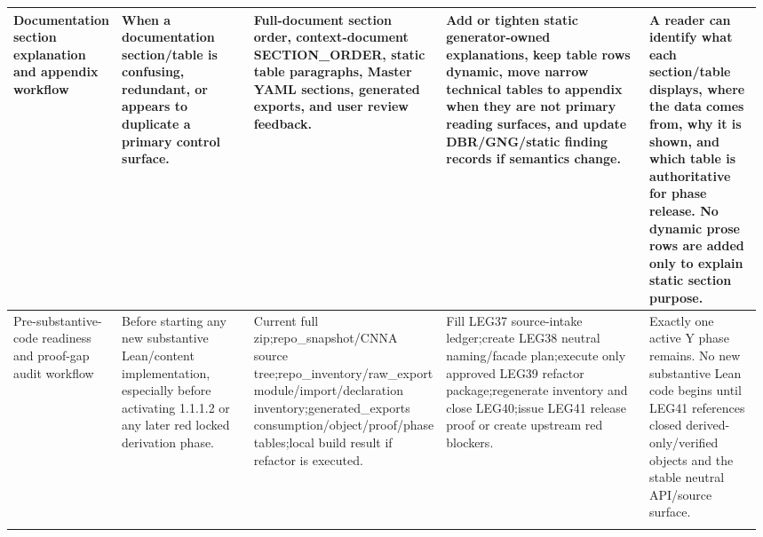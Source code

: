 \begin{longtable}{L{0.14\linewidth} L{0.19\linewidth} L{0.18\linewidth} L{0.31\linewidth} L{0.16\linewidth}}
\hline
\addlinespace[0.24em]
Documentation section explanation and appendix workflow & When a documentation section/\allowbreak{}table is confusing, redundant, or appears to duplicate a primary control surface. & Full-document section order, context-document SECTION\_ORDER, static table paragraphs, Master YAML sections, generated exports, and user review feedback. & Add or tighten static generator-owned explanations, keep table rows dynamic, move narrow technical tables to appendix when they are not primary reading surfaces, and update DBR/\allowbreak{}GNG/\allowbreak{}static finding records if semantics change. & A reader can identify what each section/\allowbreak{}table displays, where the data comes from, why it is shown, and which table is authoritative for phase release. No dynamic prose rows are added only to explain static section purpose.\\
\hline
\addlinespace[0.24em]
Pre-substantive-code readiness and proof-gap audit workflow & Before starting any new substantive Lean/\allowbreak{}content implementation, especially before activating 1.1.1.2 or any later red locked derivation phase. & Current full zip;\newline repo\_snapshot/\allowbreak{}CNNA source tree;\newline repo\_inventory/\allowbreak{}raw\_export module/\allowbreak{}import/\allowbreak{}declaration inventory;\newline generated\_exports consumption/\allowbreak{}object/\allowbreak{}proof/\allowbreak{}phase tables;\newline local build result if refactor is executed. & Fill LEG37 source-intake ledger;\newline create LEG38 neutral naming/\allowbreak{}facade plan;\newline execute only approved LEG39 refactor package;\newline regenerate inventory and close LEG40;\newline issue LEG41 release proof or create upstream red blockers. & Exactly one active Y phase remains. No new substantive Lean code begins until LEG41 references closed derived-only/\allowbreak{}verified objects and the stable neutral API/\allowbreak{}source surface.\\
\hline
\addlinespace[0.24em]

\end{longtable}
